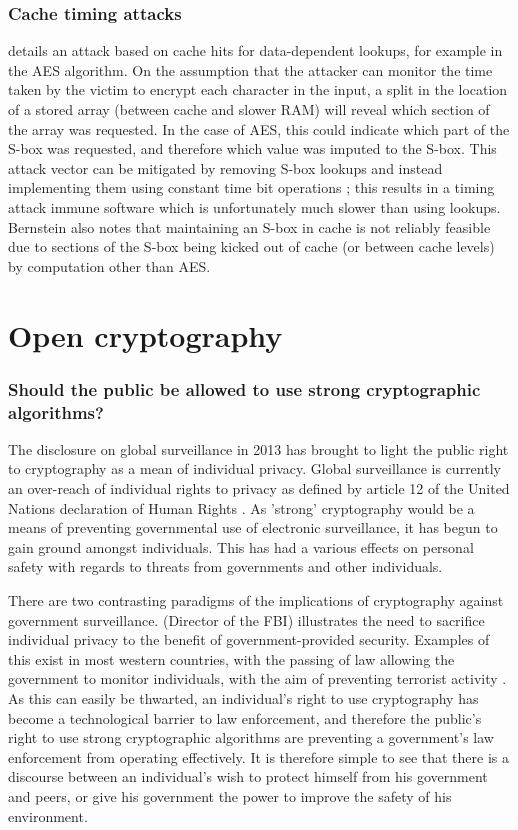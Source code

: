 \documentclass[british,10pt,a4paper]{article}
\begin{document}
\subsubsection{Cache timing attacks}
\citet{Bernstein05cache-timingattacks} details an attack based on cache hits for data-dependent lookups, for example in the AES algorithm. On the assumption that the attacker can monitor the time taken by the victim to encrypt each character in the input, a split in the location of a stored array (between cache and slower RAM) will reveal which section of the array was requested. In the case of AES, this could indicate which part of the S-box was requested, and therefore which value was imputed to the S-box. This attack vector can be mitigated by removing S-box lookups and instead implementing them using constant time bit operations \cite{Bernstein05cache-timingattacks}; this results in a timing attack immune software which is unfortunately much slower than using lookups.
Bernstein also notes that maintaining an S-box in cache is not reliably feasible due to sections of the S-box being kicked out of cache (or between cache levels) by computation other than AES. 

\clearpage
\section{Open cryptography}
\subsubsection{Should the public be allowed to use strong cryptographic algorithms?}


The disclosure on global surveillance in 2013 has brought to light the public right to cryptography as a mean of individual privacy. Global surveillance is currently an over-reach of individual rights to privacy as defined by article 12 of the United Nations declaration of Human Rights \cite{udhr}. As 'strong' cryptography would be a means of preventing governmental use of electronic surveillance, it has begun to gain ground amongst individuals. This has had a various effects on personal safety with regards to threats from governments and other individuals.

There are two contrasting paradigms of the implications of cryptography against government surveillance. \citet{James_B_Coney} (Director of the FBI) illustrates the need to sacrifice individual privacy to the benefit of government-provided security. Examples of this exist in most western countries, with the passing of law allowing the government to monitor individuals, with the aim of preventing terrorist activity \cite{data_retention}. As this can easily be thwarted, an individual's right to use cryptography has become a technological barrier to law enforcement, and therefore the public's right to use strong cryptographic algorithms are preventing a government's law enforcement from operating effectively. It is therefore simple to see that there is a discourse between an individual's wish to protect himself from his government and peers, or give his government the power to improve the safety of his environment.
\end{document}
